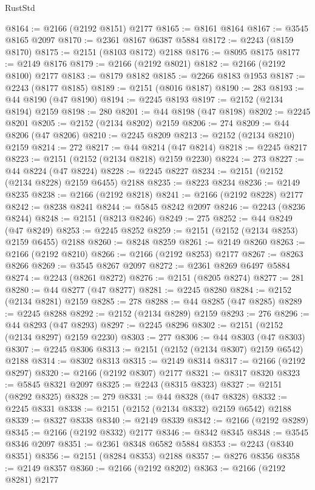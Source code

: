 \begin{lexlean}{RustStd}
\begin{coremodule}
@8164 := @2166 (@2192 @8151) @2177
@8165 := @8161 @8164
@8167 := @3545 @8165 @2097
@8170 := @2361 @8167 @6387 @5884
@8172 := @2243 (@8159 @8170)
@8175 := @2151 (@8103 @8172) @2188
@8176 := @8095 @8175
@8177 := @2149 @8176
@8179 := @2166 (@2192 @8021)
@8182 := @2166 (@2192 @8100) @2177
@8183 := @8179 @8182
@8185 := @2266 @8183 @1953
@8187 := @2243 (@8177 @8185)
@8189 := @2151 (@8016 @8187)
@8190 := 283
@8193 := @44 @8190 (@47 @8190)
@8194 := @2245 @8193
@8197 := @2152 (@2134 @8194) @2159
@8198 := 280
@8201 := @44 @8198 (@47 @8198)
@8202 := @2245 @8201
@8205 := @2152 (@2134 @8202) @2159
@8206 := 274
@8209 := @44 @8206 (@47 @8206)
@8210 := @2245 @8209
@8213 := @2152 (@2134 @8210) @2159
@8214 := 272
@8217 := @44 @8214 (@47 @8214)
@8218 := @2245 @8217
@8223 := @2151 (@2152 (@2134 @8218) @2159 @2230)
@8224 := 273
@8227 := @44 @8224 (@47 @8224)
@8228 := @2245 @8227
@8234 := @2151 (@2152 (@2134 @8228) @2159 @6455) @2188
@8235 := @8223 @8234
@8236 := @2149 @8235
@8238 := @2166 (@2192 @8218)
@8241 := @2166 (@2192 @8228) @2177
@8242 := @8238 @8241
@8244 := @5845 @8242 @2097
@8246 := @2243 (@8236 @8244)
@8248 := @2151 (@8213 @8246)
@8249 := 275
@8252 := @44 @8249 (@47 @8249)
@8253 := @2245 @8252
@8259 := @2151 (@2152 (@2134 @8253) @2159 @6455) @2188
@8260 := @8248 @8259
@8261 := @2149 @8260
@8263 := @2166 (@2192 @8210)
@8266 := @2166 (@2192 @8253) @2177
@8267 := @8263 @8266
@8269 := @3545 @8267 @2097
@8272 := @2361 @8269 @6497 @5884
@8274 := @2243 (@8261 @8272)
@8276 := @2151 (@8205 @8274)
@8277 := 281
@8280 := @44 @8277 (@47 @8277)
@8281 := @2245 @8280
@8284 := @2152 (@2134 @8281) @2159
@8285 := 278
@8288 := @44 @8285 (@47 @8285)
@8289 := @2245 @8288
@8292 := @2152 (@2134 @8289) @2159
@8293 := 276
@8296 := @44 @8293 (@47 @8293)
@8297 := @2245 @8296
@8302 := @2151 (@2152 (@2134 @8297) @2159 @2230)
@8303 := 277
@8306 := @44 @8303 (@47 @8303)
@8307 := @2245 @8306
@8313 := @2151 (@2152 (@2134 @8307) @2159 @6542) @2188
@8314 := @8302 @8313
@8315 := @2149 @8314
@8317 := @2166 (@2192 @8297)
@8320 := @2166 (@2192 @8307) @2177
@8321 := @8317 @8320
@8323 := @5845 @8321 @2097
@8325 := @2243 (@8315 @8323)
@8327 := @2151 (@8292 @8325)
@8328 := 279
@8331 := @44 @8328 (@47 @8328)
@8332 := @2245 @8331
@8338 := @2151 (@2152 (@2134 @8332) @2159 @6542) @2188
@8339 := @8327 @8338
@8340 := @2149 @8339
@8342 := @2166 (@2192 @8289)
@8345 := @2166 (@2192 @8332) @2177
@8346 := @8342 @8345
@8348 := @3545 @8346 @2097
@8351 := @2361 @8348 @6582 @5884
@8353 := @2243 (@8340 @8351)
@8356 := @2151 (@8284 @8353) @2188
@8357 := @8276 @8356
@8358 := @2149 @8357
@8360 := @2166 (@2192 @8202)
@8363 := @2166 (@2192 @8281) @2177

\end{coremodule}
\end{lexlean}
